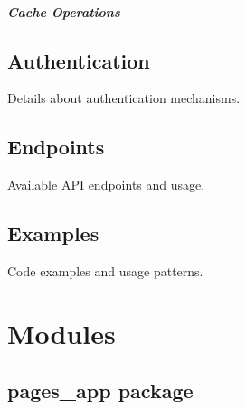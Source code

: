 \documentclass[letterpaper,10pt,english]{sphinxmanual}
\begin{document}
\subparagraph{Cache Operations}
\label{\detokenize{api/examples:cache-operations}}
\begin{sphinxVerbatim}[commandchars=\\\{\}]
   

  
  
\end{sphinxVerbatim}


\subsection{Authentication}
\label{\detokenize{api/index:authentication}}
\sphinxAtStartPar
Details about authentication mechanisms.


\subsection{Endpoints}
\label{\detokenize{api/index:endpoints}}
\sphinxAtStartPar
Available API endpoints and usage.


\subsection{Examples}
\label{\detokenize{api/index:examples}}
\sphinxAtStartPar
Code examples and usage patterns.

\sphinxstepscope


\section{Modules}
\label{\detokenize{modules:modules}}\label{\detokenize{modules::doc}}
\sphinxstepscope


\subsection{pages\_app package}
\label{\detokenize{pages_app:pages-app-package}}\label{\detokenize{pages_app::doc}}
\end{document}
